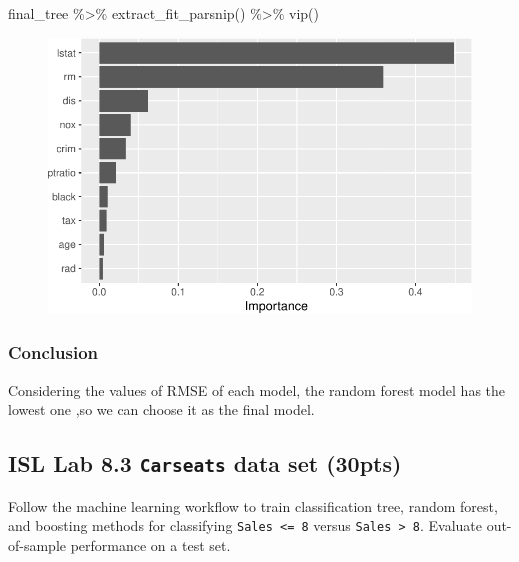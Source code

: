 \documentclass[
]{article}
\newenvironment{Shaded}{\begin{snugshade}}{\end{snugshade}}
\newcommand{\FunctionTok}[1]{\textcolor[rgb]{0.28,0.35,0.67}{#1}}
\newcommand{\NormalTok}[1]{\textcolor[rgb]{0.00,0.23,0.31}{#1}}
\newcommand{\SpecialCharTok}[1]{\textcolor[rgb]{0.37,0.37,0.37}{#1}}
\begin{document}
\begin{Shaded}
\begin{Highlighting}[]
\NormalTok{final\_tree }\SpecialCharTok{\%\textgreater{}\%} 
  \FunctionTok{extract\_fit\_parsnip}\NormalTok{() }\SpecialCharTok{\%\textgreater{}\%} 
  \FunctionTok{vip}\NormalTok{()}
\end{Highlighting}
\end{Shaded}

\begin{figure}[H]

{\centering \includegraphics{hw4_files/figure-pdf/unnamed-chunk-20-1.pdf}

}

\end{figure}

\hypertarget{conclusion}{%
\subsubsection{Conclusion}\label{conclusion}}

Considering the values of RMSE of each model, the random forest model
has the lowest one ,so we can choose it as the final model.

\hypertarget{isl-lab-8.3-carseats-data-set-30pts}{%
\subsection{\texorpdfstring{ISL Lab 8.3 \texttt{Carseats} data set
(30pts)}{ISL Lab 8.3 Carseats data set (30pts)}}\label{isl-lab-8.3-carseats-data-set-30pts}}

Follow the machine learning workflow to train classification tree,
random forest, and boosting methods for classifying
\texttt{Sales\ \textless{}=\ 8} versus
\texttt{Sales\ \textgreater{}\ 8}. Evaluate out-of-sample performance on
a test set.
\end{document}
